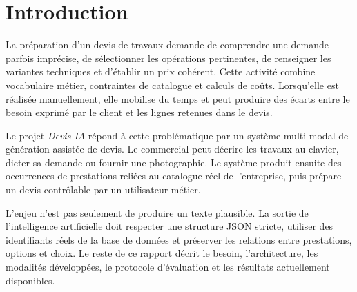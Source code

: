 \section{Introduction}
La préparation d'un devis de travaux demande de comprendre une demande parfois imprécise, de sélectionner les opérations pertinentes, de renseigner les variantes techniques et d'établir un prix cohérent. Cette activité combine vocabulaire métier, contraintes de catalogue et calculs de coûts. Lorsqu'elle est réalisée manuellement, elle mobilise du temps et peut produire des écarts entre le besoin exprimé par le client et les lignes retenues dans le devis.

Le projet \textit{Devis IA} répond à cette problématique par un système multi-modal de génération assistée de devis. Le commercial peut décrire les travaux au clavier, dicter sa demande ou fournir une photographie. Le système produit ensuite des occurrences de prestations reliées au catalogue réel de l'entreprise, puis prépare un devis contrôlable par un utilisateur métier.

L'enjeu n'est pas seulement de produire un texte plausible. La sortie de l'intelligence artificielle doit respecter une structure JSON stricte, utiliser des identifiants réels de la base de données et préserver les relations entre prestations, options et choix. Le reste de ce rapport décrit le besoin, l'architecture, les modalités développées, le protocole d'évaluation et les résultats actuellement disponibles.
